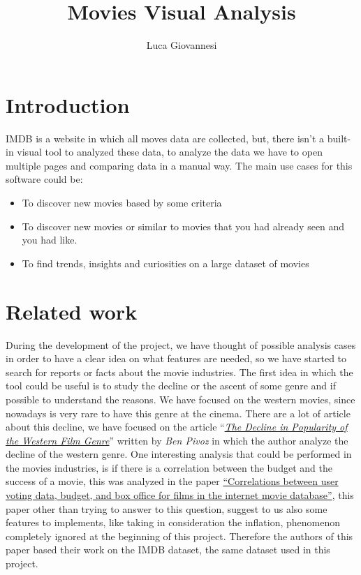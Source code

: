\documentclass[]{article}
\title{Movies Visual Analysis}
\author{Luca Giovannesi}
\date{}
\newcommand{\quotes}[1]{``#1''}
\begin{document}
\maketitle

\section{Introduction}
IMDB is a website in which all moves data are collected, but, there isn't a built-in visual tool to analyzed these data, to analyze the data we have to open multiple pages and comparing data in a manual way.\newline
The main use cases for this software could be:
\begin{itemize}
	\item To discover new movies based by some criteria
	\item To discover new movies or similar to movies that you had already seen and you had like.
	\item To find trends, insights and curiosities on a large dataset of movies
\end{itemize}
\section{Related work}
During the development of the project, we have thought of possible analysis cases in order to have a clear idea on what features are needed, so we have started to search for reports or facts about the movie industries.\newline
The first idea in which the tool could be useful is to study the decline or the ascent of some genre and if possible to understand the reasons. We have focused on the western movies, since nowadays is very rare to have this genre at the cinema. There are a lot of article about this decline, we have focused on the article \quotes{\emph{\href{https://screenculturejournal.com/2017/04/the-decline-in-popularity-of-the-western-film-genre/}{The Decline in Popularity of the Western Film Genre}}} written by \emph{Ben Pivoz} in which the author analyze the decline of the western genre.\newline\newline
One interesting analysis that could be performed in the movies industries, is if there is a correlation between the budget and the success of a movie, this was analyzed in the paper \href{https://asistdl.onlinelibrary.wiley.com/doi/full/10.1002/asi.23213}{\quotes{Correlations between user voting data, budget, and box office for films in the internet movie database}}, this paper other than trying to answer to this question, suggest to us also some features to implements, like taking in consideration the inflation, phenomenon completely ignored at the beginning of this project. Therefore the authors of this paper based their work on the IMDB dataset, the same dataset used in this project.
\end{document}
